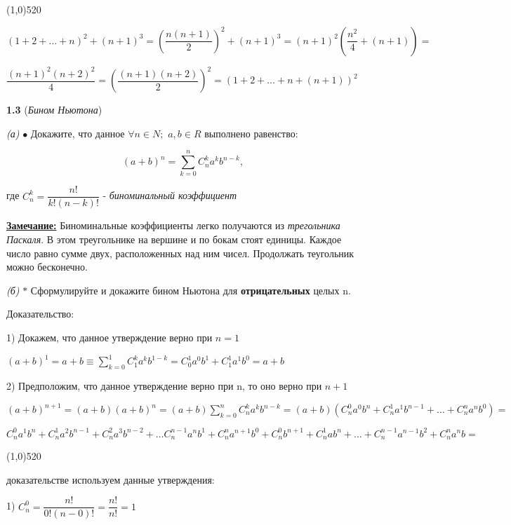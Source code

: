 \documentclass[12pt]{article}
\begin{document}
	\medskip
	
	\vspace{-3mm}
	\line(1,0){520}
	
	$
	(1+2+\dots+n)^2+(n+1)^3 = \left(\dfrac{n(n+1)}{2}\right)^2+(n+1)^3 = (n+1)^2\left(\dfrac{n^2}{4}+(n+1)\right) = 
	$
	
	$
	\dfrac{(n+1)^2(n+2)^2}{4} = \left(\dfrac{(n+1)(n+2)}{2}\right)^2 = (1+2+\dots+n+(n+1))^2
	$
	
	\smallskip
	\medskip
	
	{\bf 1.3} ({\it Бином Ньютона})
	
	{\it (а)}  $\bullet$ Докажите, что данное $\forall n\in N;$ $a,b\in R$ выполнено равенство:
	
	\[
		(a+b)^n = \sum_{k=0}^{n}C_n^k a^k b^{n-k},
	\]
	
	где $C_n^k = \dfrac{n!}{k!(n-k)!}$ - {\it биноминальный коэффициент}
	\smallskip
	
	\underline{\bf Замечание:} Биноминальные коэффициенты легко получаются из {\it трегольника Паскаля}. В этом треугольнике на вершине и по бокам стоят единицы. Каждое число равно сумме двух, расположенных над ним чисел. Продолжать теугольник можно бесконечно.\vspace{2mm}
	
	{\it (б)} $\ast$ Сформулируйте и докажите бином Ньютона для {\bf отрицательных} целых n.
	
	\hspace{-2mm} Доказательство:
	
	1) Докажем, что данное утверждение верно при $n=1$
	
	\quad$
		(a+b)^1 = a+b \equiv \sum_{k=0}^{1}C_1^k a^k b^{1-k} = C_0^1 a^0 b^1+ C_1^1 a^1 b^0 = a+b
	$
	\vspace{2mm}
	
	2) Предположим, что данное утверждение верно при n, то оно верно при $n+1$\medskip
	
	$
		(a+b)^{n+1} = (a+b)(a+b)^n = (a+b)\sum_{k=0}^{n}C_n^k a^k b^{n-k} = (a+b)(C_n^0 a^0 b^{n}+C_n^1 a^1b^{n-1}+\dots+C_n^n a^nb^0)=
	$
	
	$
	C_n^0a^1b^n+C_n^1a^2b^{n-1}+C_n^2a^3b^{n-2}+\dots C_n^{n-1}a^nb^1+C_n^na^{n+1}b^0 +C_n^0b^{n+1}+ C_n^1ab^{n}+\dots +C_n^{n-1}a^{n-1}b^2+C_n^na^nb=
	$
	
	\line(1,0){520}
	\vspace{2mm}
	
	 доказательстве используем данные утверждения:
	
	1) $C_n^0 = \dfrac{n!}{0!(n-0)!} = \dfrac{n!}{n!} = 1$
	
\end{document}
